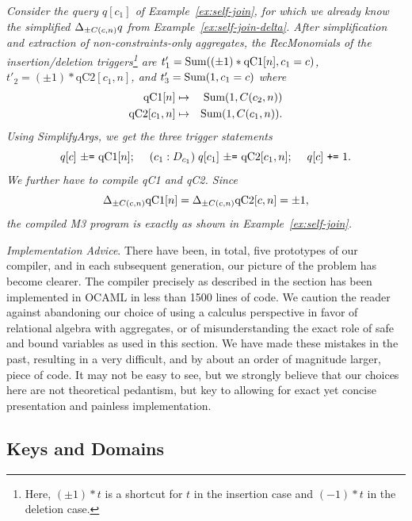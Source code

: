 \begin{example}\em
\label{ex:self-join-compile}
Consider the query $q[c_1]$ of
Example~\ref{ex:self-join}, for which we already know
the simplified $\Delta_{\pm C(c,n)} q$ from Example~\ref{ex:self-join-delta}.
After simplification and extraction of non-constraints-only aggregates,
the RecMonomials of the insertion/deletion triggers\footnote{Here,
$(\pm 1) * t$ is a shortcut for $t$ in the insertion case and
$(-1)*t$ in the deletion case.} are
$t'_1 = \mbox{Sum}((\pm 1) * \mbox{qC1}[n], c_1=c)$,
$t'_2 = (\pm 1) * \mbox{qC2}[c_1, n]$, and
$t'_3 = \mbox{Sum}(1, c_1=c)$
where
\begin{eqnarray*}
\mbox{qC1}[n] &\mapsto& \mbox{Sum}(1, C(c_2, n)) \\
\mbox{qC2}[c_1, n] &\mapsto& \mbox{Sum}(1, C(c_1,n)).
\end{eqnarray*}
Using SimplifyArgs, we get the three trigger statements
\[
q[c] \mbox{ {\tt $\pm$=} qC1}[n]; \quad\;
(c_1: D_{c_1}) \; q[c_1] \mbox{ {\tt $\pm$=} qC2}[c_1, n]; \quad\;
q[c] \mbox{ {\tt +=} } 1.
\]
We further have to compile qC1 and qC2. Since
\[
\Delta_{\pm C(c,n)} \mbox{qC1}[n] = \Delta_{\pm C(c,n)} \mbox{qC2}[c,n] = \pm 1,
\]
the compiled M3 program is exactly as shown in Example~\ref{ex:self-join}.
\punto
\end{example}


{\em Implementation Advice}.
There have been, in total, five prototypes of our compiler, and
in each subsequent generation, our picture of the problem has become clearer.
The compiler precisely as described in the section has been implemented
in OCAML in less than 1500 lines of code. We caution the reader against
abandoning our choice of using a calculus perspective
in favor of relational algebra with aggregates, or of misunderstanding
the exact role of safe and bound variables as used in this section.
We have made these mistakes in the past, resulting in 
a very difficult, and by about an order of magnitude larger, piece of code.
It may not be easy to see, but we strongly believe that
our choices here are not theoretical pedantism,
but key to allowing for exact yet concise presentation
and painless implementation.


\subsection{Keys and Domains}


